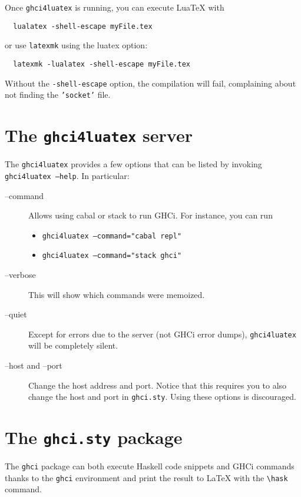\documentclass{article}
\begin{document}
Once \texttt{ghci4luatex} is running, you can execute LuaTeX with

\begin{verbatim}
  lualatex -shell-escape myFile.tex
\end{verbatim}

or use \texttt{latexmk} using the luatex option:

\begin{verbatim}
  latexmk -lualatex -shell-escape myFile.tex
\end{verbatim}

\begin{warningbox}
  Without the \texttt{-shell-escape} option, the compilation will fail, complaining about not finding the \texttt{'socket'} file.
\end{warningbox}

\section{The \texttt{ghci4luatex} server}

The  \texttt{ghci4luatex} provides a few options that can be listed by invoking \texttt{ghci4luatex --help}. In particular:

\begin{description}
  \item[--command] Allows using cabal or stack to run GHCi. For instance, you can run \begin{itemize}
    \item \texttt{ghci4luatex --command="cabal repl"}
    \item \texttt{ghci4luatex --command="stack ghci"}
  \end{itemize}
  \item[--verbose] This will show which commands were memoized.
  \item[--quiet] Except for errors due to the server (not GHCi error dumps), \texttt{ghci4luatex} will be completely silent.
  \item[--host and --port] Change the host address and port. Notice that this requires you to also change the host and port in \texttt{ghci.sty}. Using these options is discouraged.
\end{description}


\section{The \texttt{ghci.sty} package}

The \texttt{ghci} package can both execute Haskell code snippets and GHCi commands thanks to the \texttt{ghci} environment and print the result to LaTeX with the \texttt{\textbackslash hask} command.
\end{document}
